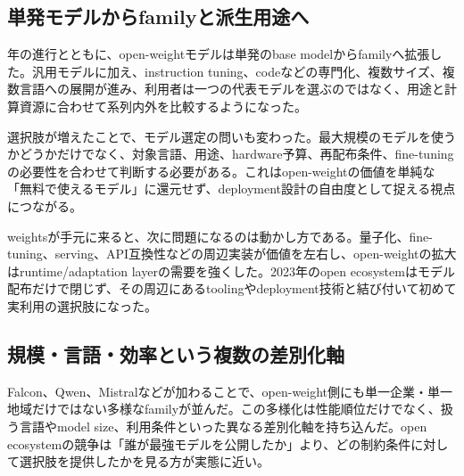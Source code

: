 \subsection{単発モデルからfamilyと派生用途へ}

年の進行とともに、open-weightモデルは単発のbase modelからfamilyへ拡張した。汎用モデルに加え、instruction tuning、codeなどの専門化、複数サイズ、複数言語への展開が進み、利用者は一つの代表モデルを選ぶのではなく、用途と計算資源に合わせて系列内外を比較するようになった。\autocite{src-00c370ab2324,src-240ca564b6b8,src-3db09fede330,src-5c8e2db8871a,src-8bdb904686fb,src-9df482e2c96c,src-b7e5243e6d59,src-bc7aba201f01,src-d4b6359bbad1,src-dd2cfa98160d,src-f0349196879e}


選択肢が増えたことで、モデル選定の問いも変わった。最大規模のモデルを使うかどうかだけでなく、対象言語、用途、hardware予算、再配布条件、fine-tuningの必要性を合わせて判断する必要がある。これはopen-weightの価値を単純な「無料で使えるモデル」に還元せず、deployment設計の自由度として捉える視点につながる。\autocite{src-00c370ab2324,src-1fd43f93adcc,src-240ca564b6b8,src-3db09fede330,src-5c8e2db8871a,src-74aa7e2a7ca4,src-81f670ec1e74,src-8bdb904686fb,src-9df482e2c96c,src-b7e5243e6d59,src-bc7aba201f01,src-d4b6359bbad1,src-dd2cfa98160d,src-f0349196879e}


weightsが手元に来ると、次に問題になるのは動かし方である。量子化、fine-tuning、serving、API互換性などの周辺実装が価値を左右し、open-weightの拡大はruntime/adaptation layerの需要を強くした。2023年のopen ecosystemはモデル配布だけで閉じず、その周辺にあるtoolingやdeployment技術と結び付いて初めて実利用の選択肢になった。\autocite{src-00c370ab2324,src-240ca564b6b8,src-3db09fede330,src-8bdb904686fb,src-9df482e2c96c,src-b7e5243e6d59,src-bc7aba201f01,src-dd2cfa98160d,src-f0349196879e}


\subsection{規模・言語・効率という複数の差別化軸}

Falcon、Qwen、Mistralなどが加わることで、open-weight側にも単一企業・単一地域だけではない多様なfamilyが並んだ。この多様化は性能順位だけでなく、扱う言語やmodel size、利用条件といった異なる差別化軸を持ち込んだ。open ecosystemの競争は「誰が最強モデルを公開したか」より、どの制約条件に対して選択肢を提供したかを見る方が実態に近い。\autocite{src-00c370ab2324,src-1fd43f93adcc,src-5c8e2db8871a,src-74aa7e2a7ca4,src-81f670ec1e74,src-d4b6359bbad1,src-dd2cfa98160d,src-f0349196879e}


